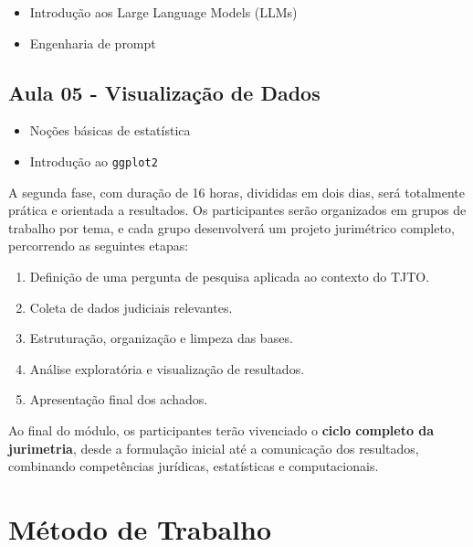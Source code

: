 \documentclass[
  letterpaper,
  DIV=11,
  numbers=noendperiod]{scrreprt}
\providecommand{\tightlist}{%
  \setlength{\itemsep}{0pt}\setlength{\parskip}{0pt}}
\begin{document}
\begin{itemize}
\tightlist
\item
  Introdução aos Large Language Models (LLMs)\\
\item
  Engenharia de prompt
\end{itemize}

\subsection{Aula 05 - Visualização de
Dados}\label{aula-05---visualizauxe7uxe3o-de-dados}

\begin{itemize}
\tightlist
\item
  Noções básicas de estatística\\
\item
  Introdução ao \texttt{ggplot2}
\end{itemize}

A segunda fase, com duração de 16 horas, divididas em dois dias, será
totalmente prática e orientada a resultados. Os participantes serão
organizados em grupos de trabalho por tema, e cada grupo desenvolverá um
projeto jurimétrico completo, percorrendo as seguintes etapas:

\begin{enumerate}
\def\labelenumi{\arabic{enumi}.}
\tightlist
\item
  Definição de uma pergunta de pesquisa aplicada ao contexto do TJTO.\\
\item
  Coleta de dados judiciais relevantes.\\
\item
  Estruturação, organização e limpeza das bases.\\
\item
  Análise exploratória e visualização de resultados.\\
\item
  Apresentação final dos achados.
\end{enumerate}

Ao final do módulo, os participantes terão vivenciado o \textbf{ciclo
completo da jurimetria}, desde a formulação inicial até a comunicação
dos resultados, combinando competências jurídicas, estatísticas e
computacionais.

\section{Método de Trabalho}\label{muxe9todo-de-trabalho}
\end{document}
